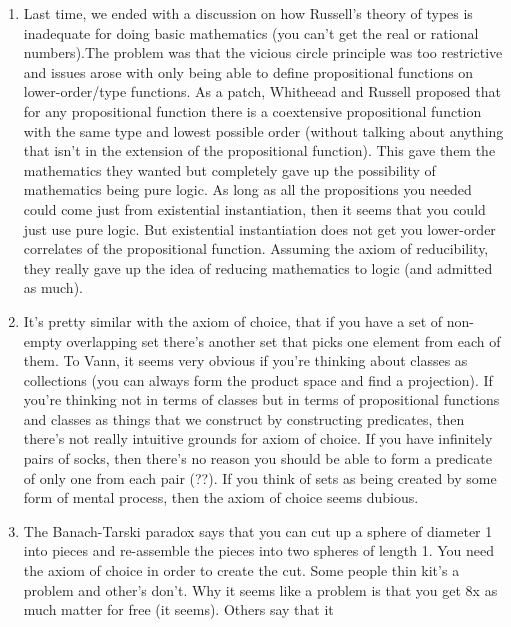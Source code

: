 \documentclass[12pt]{article}
\theoremstyle{definition}
\begin{document}
\begin{enumerate}
    \itemsep0em 
    \item 
        Last time, we ended with a discussion on how Russell's theory of types
        is inadequate for doing basic mathematics (you can't get the real or
        rational numbers).The problem was that the vicious circle principle was
        too restrictive and issues arose with only being able to define
        propositional functions on lower-order/type functions. As a patch,
        Whitheead and Russell proposed that for any propositional function
        there is a coextensive propositional function with the same type and
        lowest possible order (without talking about anything that isn't in the
        extension of the propositional function). This gave them the
        mathematics they wanted but completely gave up the possibility of
        mathematics being pure logic. As long as all the propositions you
        needed could come just from existential instantiation, then it seems
        that you could just use pure logic. But existential instantiation does
        not get you lower-order correlates of the propositional function.
        Assuming the axiom of reducibility, they really gave up the idea of
        reducing mathematics to logic (and admitted as much).
    \item
       It's pretty similar with the axiom of choice, that if you have a set of
       non-empty overlapping set there's another set that picks one element
       from each of them. To Vann, it seems very obvious if you're thinking
       about classes as collections (you can always form the product space and
       find a projection). If you're thinking not in terms of classes but in
       terms of propositional functions and classes as things that we construct
       by constructing predicates, then there's not really intuitive grounds
       for axiom of choice. If you have infinitely pairs of socks, then there's
       no reason you should be able to form a predicate of only one from each
       pair (??). If you think of sets as being created by some form of mental
       process, then the axiom of choice seems dubious.
    \item
        The Banach-Tarski paradox says that you can cut up a sphere of diameter
        1 into pieces and re-assemble the pieces into two spheres of length 1.
        You need the axiom of choice in order to create the cut. Some people
        thin kit's a problem and other's don't. Why it seems like a problem is
        that you get 8x as much matter for free (it seems). Others say that it

\end{enumerate}
\end{document}
